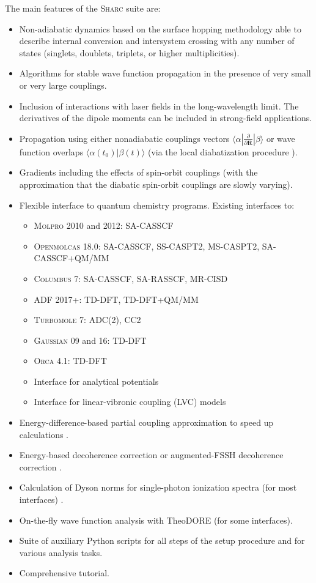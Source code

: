 \documentclass[a4paper,10pt,DIV=15,openany]{scrbook}
\newcommand{\sharc}{\textsc{Sharc}}
\begin{document}
The main features of the \sharc{} suite are:
\begin{itemize}
  \item Non-adiabatic dynamics based on the surface hopping methodology able to describe internal conversion and intersystem crossing with any number of states (singlets, doublets, triplets, or higher multiplicities).
  \item Algorithms for stable wave function propagation in the presence of very small or very large couplings.
  \item Inclusion of interactions with laser fields in the long-wavelength limit. The derivatives of the dipole moments can be included in strong-field applications.
  \item Propagation using either nonadiabatic couplings vectors $\langle\alpha|\frac{\partial}{\partial \mathbf{R}}|\beta\rangle$ or wave function overlaps $\langle\alpha(t_0)|\beta(t)\rangle$ (via the local diabatization procedure \cite{Granucci2007JCP}).
  \item Gradients including the effects of spin-orbit couplings (with the approximation that the diabatic spin-orbit couplings are slowly varying).
  \item Flexible interface to quantum chemistry programs. Existing interfaces to:
  \begin{itemize}
    \item \textsc{Molpro} 2010 and 2012: SA-CASSCF
    \item \textsc{Openmolcas} 18.0: SA-CASSCF, SS-CASPT2, MS-CASPT2, SA-CASSCF+QM/MM
    \item \textsc{Columbus} 7: SA-CASSCF, SA-RASSCF, MR-CISD
    \item \textsc{ADF} 2017+: TD-DFT, TD-DFT+QM/MM
    \item \textsc{Turbomole} 7: ADC(2), CC2
    \item \textsc{Gaussian} 09 and 16: TD-DFT
    \item \textsc{Orca} 4.1: TD-DFT
    \item Interface for analytical potentials
    \item Interface for linear-vibronic coupling (LVC) models
  \end{itemize}
  \item Energy-difference-based partial coupling approximation to speed up calculations \cite{Pittner2009CP}.
  \item Energy-based decoherence correction \cite{Granucci2007JCP} or augmented-FSSH decoherence correction \cite{Jain2016JCTC}.
  \item Calculation of Dyson norms for single-photon ionization spectra (for most interfaces) \cite{Ruckenbauer2016SR}.
  \item On-the-fly wave function analysis with TheoDORE \cite{Plasser2014JCP1, Plasser2014JCP2, Plasser2017TheoDORE} (for some interfaces).
  \item Suite of auxiliary Python scripts for all steps of the setup procedure and for various analysis tasks.
  \item Comprehensive tutorial.
\end{itemize}
\end{document}
